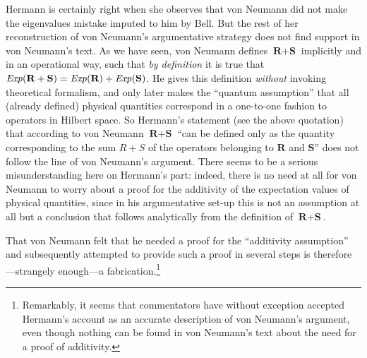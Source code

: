 \documentclass[12pt]{article}
\begin{document}
Hermann is certainly right when she observes that von Neumann did not make the eigenvalues mistake imputed to him by Bell. But the rest of her reconstruction of von Neumann's argumentative strategy does not find support in von Neumann's text. As we have seen, von Neumann defines $\textbf{R} + \textbf{S}$ implicitly and in an operational way, such that \emph{by definition} it is true that ${\it Exp}(\textbf{R} + \textbf{S}) = {\it Exp}(\textbf{R}) + {\it Exp}(\textbf{S})$. He gives this definition \emph{without} invoking theoretical formalism, and only later makes the ``quantum assumption'' that all (already defined) physical quantities correspond in a one-to-one fashion to operators in Hilbert space. So Hermann's statement (see the above quotation) that according to von Neumann $\textbf{R} + \textbf{S}$ ``can be defined only as the quantity corresponding to the sum $R + S$ of the operators belonging to $\textbf{R}$ and $\textbf{S}$'' does not follow the line of von Neumann's argument. There seems to be a serious misunderstanding here on Hermann's part: indeed, there is no need at all for von Neumann to worry about a proof for the additivity of the expectation values of physical quantities, since in his argumentative set-up this is not an assumption at all but a conclusion  that follows analytically from the definition of $\textbf{R} + \textbf{S}$.

That von Neumann felt that he needed a proof for the ``additivity assumption'' and subsequently attempted to provide such a proof in several steps is therefore---strangely enough---a fabrication.\footnote{Remarkably, it seems that commentators have without exception accepted Hermann's account as an accurate description of von Neumann's argument, even though nothing can be found in von Neumann's text about the need for a proof of additivity.}
\end{document}
